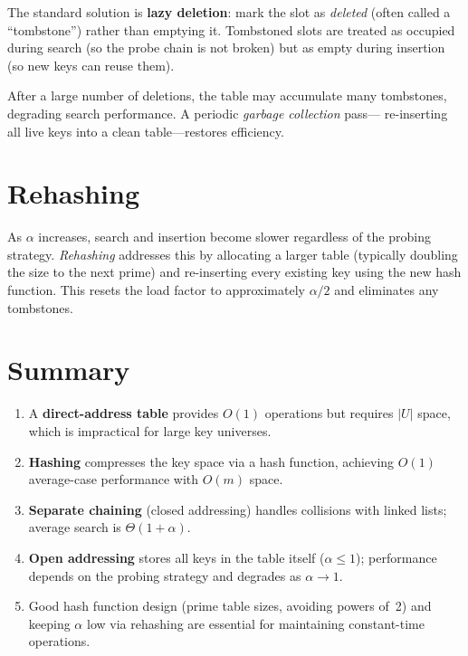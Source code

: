 \documentclass[11pt, a4paper, notitlepage]{report}
\theoremstyle{definition}
\theoremstyle{remark}
\theoremstyle{definition}
\begin{document}
The standard solution is \textbf{lazy deletion}: mark the slot as
\emph{deleted} (often called a ``tombstone'') rather than emptying it.
Tombstoned slots are treated as occupied during search (so the probe chain
is not broken) but as empty during insertion (so new keys can reuse them).

After a large number of deletions, the table may accumulate many tombstones,
degrading search performance.  A periodic \emph{garbage collection} pass---
re-inserting all live keys into a clean table---restores efficiency.

\section{Rehashing}
\label{sec:rehashing}

As $\alpha$ increases, search and insertion become slower regardless of the
probing strategy.  \emph{Rehashing} addresses this by allocating a larger
table (typically doubling the size to the next prime) and re-inserting every
existing key using the new hash function.  This resets the load factor to
approximately $\alpha/2$ and eliminates any tombstones.

\section{Summary}
\label{sec:hash-summary}

\begin{keyresult}[title={Key Result: Hash Table Performance}]
\begin{enumerate}
  \item A \textbf{direct-address table} provides $O(1)$ operations but
        requires $|U|$ space, which is impractical for large key universes.
  \item \textbf{Hashing} compresses the key space via a hash function,
        achieving $O(1)$ average-case performance with $O(m)$ space.
  \item \textbf{Separate chaining} (closed addressing) handles collisions with
        linked lists; average search is $\Theta(1 + \alpha)$.
  \item \textbf{Open addressing} stores all keys in the table itself
        ($\alpha \le 1$); performance depends on the probing strategy and
        degrades as $\alpha \to 1$.
  \item Good hash function design (prime table sizes, avoiding powers of~2)
        and keeping $\alpha$ low via rehashing are essential for maintaining
        constant-time operations.
\end{enumerate}
\end{keyresult}
\end{document}
